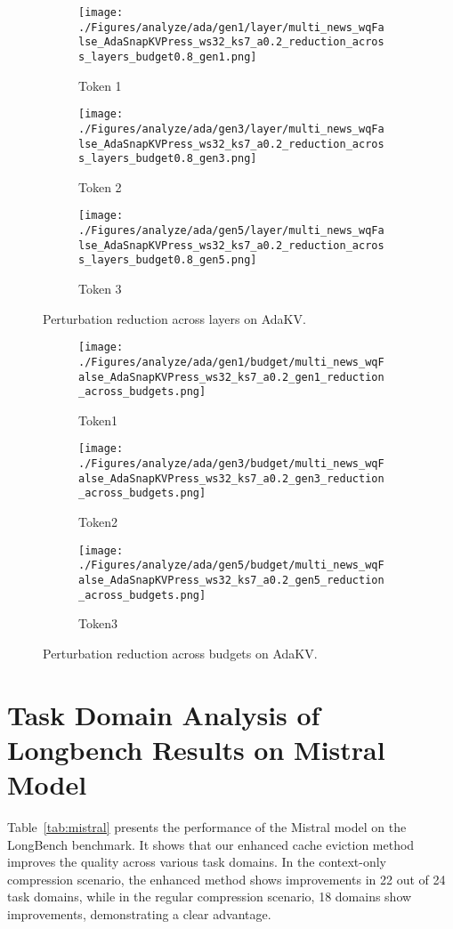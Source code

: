 \begin{figure}[t]
			\centering
	\begin{subfigure}[b]{0.25\linewidth}
		\texttt{[image: ./Figures/analyze/ada/gen1/layer/multi\_news\_wqFalse\_AdaSnapKVPress\_ws32\_ks7\_a0.2\_reduction\_across\_layers\_budget0.8\_gen1.png]}
		\caption{Token 1}
	\end{subfigure}
	\begin{subfigure}[b]{0.25\linewidth}
		\texttt{[image: ./Figures/analyze/ada/gen3/layer/multi\_news\_wqFalse\_AdaSnapKVPress\_ws32\_ks7\_a0.2\_reduction\_across\_layers\_budget0.8\_gen3.png]}
		\caption{Token 2}
	\end{subfigure}
	\begin{subfigure}[b]{0.25\linewidth}
		\texttt{[image: ./Figures/analyze/ada/gen5/layer/multi\_news\_wqFalse\_AdaSnapKVPress\_ws32\_ks7\_a0.2\_reduction\_across\_layers\_budget0.8\_gen5.png]}
		\caption{Token 3}
	\end{subfigure}
	\caption{Perturbation reduction across layers on AdaKV.}
	\label{fig:detail_layer_reduction}
	
	\centering
	\begin{subfigure}[b]{0.25\linewidth}
		\texttt{[image: ./Figures/analyze/ada/gen1/budget/multi\_news\_wqFalse\_AdaSnapKVPress\_ws32\_ks7\_a0.2\_gen1\_reduction\_across\_budgets.png]}
		\caption{Token1}
	\end{subfigure}
	\begin{subfigure}[b]{0.25\linewidth}
		\texttt{[image: ./Figures/analyze/ada/gen3/budget/multi\_news\_wqFalse\_AdaSnapKVPress\_ws32\_ks7\_a0.2\_gen3\_reduction\_across\_budgets.png]}
		\caption{Token2}
	\end{subfigure}
	\begin{subfigure}[b]{0.25\linewidth}
		\texttt{[image: ./Figures/analyze/ada/gen5/budget/multi\_news\_wqFalse\_AdaSnapKVPress\_ws32\_ks7\_a0.2\_gen5\_reduction\_across\_budgets.png]}
		\caption{Token3}
	\end{subfigure}
	\caption{Perturbation reduction across budgets on AdaKV.}
	\label{fig:detail_budget_reduction}
\end{figure}






\section{Task Domain Analysis of Longbench Results on Mistral Model}
\label{apdx:longbench_mistral}
Table~\ref{tab:mistral} presents the performance of the Mistral model on the LongBench benchmark. It shows that our enhanced cache eviction method improves the quality across various task domains. In the context-only compression scenario, the enhanced method shows improvements in 22 out of 24 task domains, while in the regular compression scenario, 18 domains show improvements, demonstrating a clear advantage.

